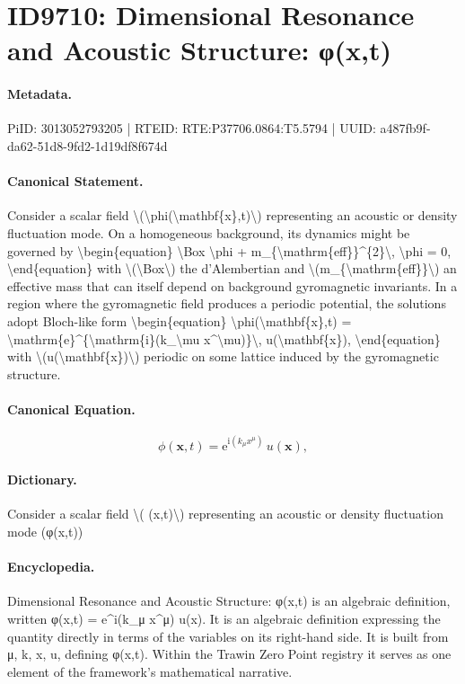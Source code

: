 \section*{ID9710: Dimensional Resonance and Acoustic Structure: φ(x,t)}
\paragraph{Metadata.}
PiID: 3013052793205 | RTEID: RTE:P37706.0864:T5.5794 | UUID: a487fb9f-da62-51d8-9fd2-1d19df8f674d

\paragraph{Canonical Statement.}
Consider a scalar field \textbackslash{}(\textbackslash{}phi(\textbackslash{}mathbf\{x\},t)\textbackslash{}) representing an acoustic or density fluctuation mode. On a homogeneous background, its dynamics might be governed by \textbackslash{}begin\{equation\} \textbackslash{}Box \textbackslash{}phi + m\_\{\textbackslash{}mathrm\{eff\}\}\textasciicircum{}\{2\}\textbackslash{}, \textbackslash{}phi = 0, \textbackslash{}end\{equation\} with \textbackslash{}(\textbackslash{}Box\textbackslash{}) the d'Alembertian and \textbackslash{}(m\_\{\textbackslash{}mathrm\{eff\}\}\textbackslash{}) an effective mass that can itself depend on background gyromagnetic invariants. In a region where the gyromagnetic field produces a periodic potential, the solutions adopt Bloch-like form \textbackslash{}begin\{equation\} \textbackslash{}phi(\textbackslash{}mathbf\{x\},t) = \textbackslash{}mathrm\{e\}\textasciicircum{}\{\textbackslash{}mathrm\{i\}(k\_\textbackslash{}mu x\textasciicircum{}\textbackslash{}mu)\}\textbackslash{}, u(\textbackslash{}mathbf\{x\}), \textbackslash{}end\{equation\} with \textbackslash{}(u(\textbackslash{}mathbf\{x\})\textbackslash{}) periodic on some lattice induced by the gyromagnetic structure.

\paragraph{Canonical Equation.}
\[
\phi(\mathbf{x},t) = \mathrm{e}^{\mathrm{i}(k_\mu x^\mu)}\, u(\mathbf{x}),
\]

\paragraph{Dictionary.}
Consider a scalar field \textbackslash{}( (x,t)\textbackslash{}) representing an acoustic or density fluctuation mode (φ(x,t))

\paragraph{Encyclopedia.}
Dimensional Resonance and Acoustic Structure: φ(x,t) is an algebraic definition, written φ(x,t) = e\textasciicircum{}i(k\_μ x\textasciicircum{}μ) u(x). It is an algebraic definition expressing the quantity directly in terms of the variables on its right-hand side. It is built from μ, k, x, u, defining φ(x,t). Within the Trawin Zero Point registry it serves as one element of the framework's mathematical narrative.
